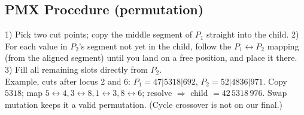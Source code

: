 \subsection*{PMX Procedure (permutation)}
1) Pick two cut points; copy the middle segment of \(P_1\) straight into the child. 2) For each value in \(P_2\)'s segment not yet in the child, follow the \(P_1\!\leftrightarrow\!P_2\) mapping (from the aligned segment) until you land on a free position, and place it there. 3) Fill all remaining slots directly from \(P_2\).\\
Example, cuts after locus 2 and 6: \(P_1{=}47|5318|692\), \(P_2{=}52|4836|971\). Copy \(5318\); map \(5{\leftrightarrow}4,3{\leftrightarrow}8,1{\leftrightarrow}3,8{\leftrightarrow}6\); resolve \(\Rightarrow\) child \(=42\,5318\,976\). Swap mutation keeps it a valid permutation. (Cycle crossover is not on our final.)
